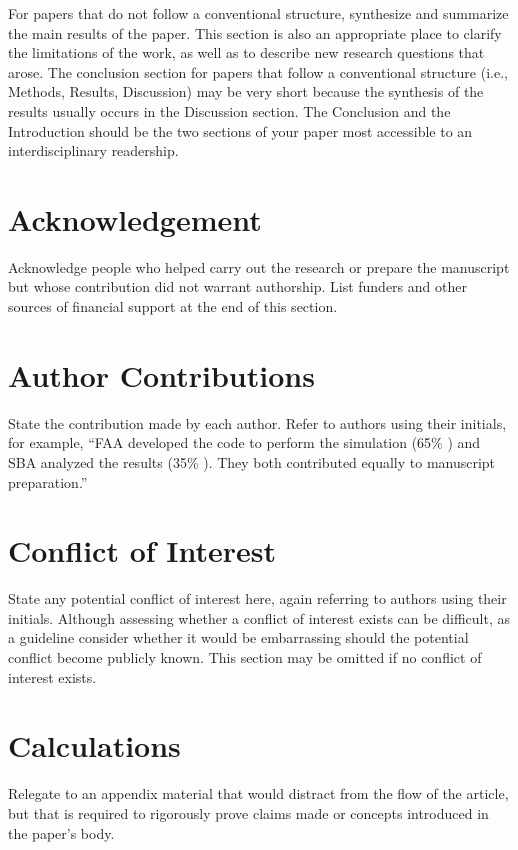 \documentclass{ledger}
\begin{document}
For papers that do not follow a conventional structure, synthesize and summarize the main results of the paper.  This section is also an appropriate place to clarify the limitations of the work, as well as to describe new research questions that arose.  The conclusion section for papers that follow a conventional structure (i.e., Methods, Results, Discussion) may be very short because the synthesis of the results usually occurs in the Discussion section.  The Conclusion and the Introduction should be the two sections of your paper most accessible to an interdisciplinary readership.

\section{Acknowledgement}

Acknowledge people who helped carry out the research or prepare the manuscript but whose contribution did not warrant authorship.  List funders and other sources of financial support at the end of this section.

\section{Author Contributions}

State the contribution made by each author.  Refer to authors using their initials, for example, ``FAA developed the code to perform the simulation (65\% ) and SBA analyzed the results (35\% ).  They both contributed equally to manuscript preparation.''

\section{Conflict of Interest}

State any potential conflict of interest here, again referring to authors using their initials.  Although assessing whether a conflict of interest exists can be difficult, as a guideline consider whether it would be embarrassing should the potential conflict become publicly known.  This section may be omitted if no conflict of interest exists.

\appendix

\section{Calculations}

Relegate to an appendix material that would distract from the flow of the article, but that is required to rigorously prove claims made or concepts introduced in the paper’s body.

\theendnotes
\end{document}
